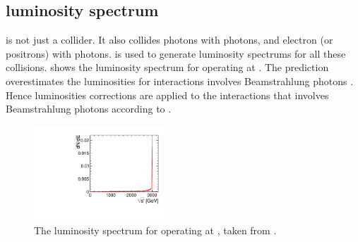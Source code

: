 



\subsection{\CLIC luminosity spectrum}
\label{sec:pandoraCLUClumi}


\CLIC is not just a \ee collider. It also collides photons with photons, and electron (or positrons) with photons. \Guineapig \cite{Schulte:1999tx} is used to generate luminosity spectrums for all these collisions.  shows the  luminosity spectrum for \CLIC operating at . The \Guineapig prediction overestimates the  luminosities for interactions involves Beamstrahlung photons \cite{Sailer:lumi}. Hence luminosities corrections are applied to the  interactions that involves Beamstrahlung photons according to .

\begin{figure}[tbph]
\centering
    \includegraphics[width=0.45\textwidth]{pandora/Lumi3TeV_fixed_nopeak.pdf}
\caption
{The luminosity spectrum for \CLIC operating at , taken from \cite{Linssen:2012hp}.}
\label{fig:pandoraCLICLumiSpec}
\end{figure}


